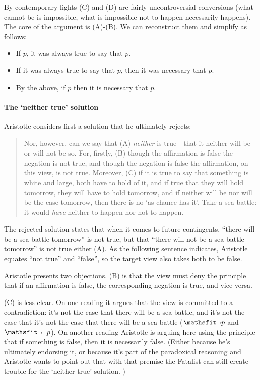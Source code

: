 \documentclass[../../../include/open-logic-section]{subfiles}
\begin{document}
By contemporary lights (C) and (D) are fairly uncontroversial conversions (what cannot be is impossible, what is impossible not to happen necessarily happens). The core of the argument is (A)-(B). We can reconstruct them and simplify as follows:

\begin{itemize}
	\item If $p$, it was always true to say that $p$.
	\item If it was always true to say that $p$, then it was necessary that $p$.
	\item By the above, if $p$ then it is necessary that $p$. 
\end{itemize}

\paragraph*{The `neither true' solution}

Aristotle considers first a solution that he ultimately rejects:

\begin{quote}
	Nor, however, can we say that (A) \emph{neither} is true---that it neither will be or will not be so. For, firstly, (B) though the affirmation is false the negation is not true, and though the negation is false the affirmation, on this view, is not true. Moreover, (C) if it is true to say that something is white and large, both have to hold of it, and if true that they will hold tomorrow, they will have to hold tomorrow, and if neither will be nor will be the case tomorrow, then there is no `as chance has it'. Take a sea-battle: it would \emph{have} neither to happen nor not to happen. 
\end{quote}

The rejected solution states that when it comes to future contingents, ``there will be a sea-battle tomorrow'' is not true, but that ``there will not be a sea-battle tomorrow'' is not true either (A). As the following sentence indicates, Aristotle equates ``not true'' and ``false'', so the target view also takes both to be false.

Aristotle presents two objections. (B) is that the view must deny the principle that if an affirmation is false, the corresponding negation is true, and vice-versa. 

(C) is less clear. On one reading it argues that the view is committed to a contradiction: it's not the case that there will be a sea-battle, and it's not the case that it's not the case that there will be a sea-battle ($\Obj{\lnot p}$ and $\Obj {\lnot \lnot p}$). On another reading Aristotle is arguing here using the principle that if something is false, then it is necessarily false. (Either because he's ultimately endorsing it, or because it's part of the paradoxical reasoning and Aristotle wants to point out that with that premise the Fatalist can still create trouble for the `neither true' solution. )
\end{document}
